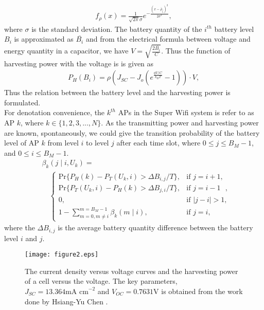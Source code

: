 \documentclass[conference]{IEEEtran}
\begin{document}
\begin{equation}
\begin{aligned}
f_{\rho}(x) = \frac {1} {\sqrt {2\pi}\sigma} e ^{-\frac {(x-\bar{\rho}_\zeta)^2} {2 {\sigma}^2}},
\end{aligned}
\end{equation}
where \(\sigma\) is the standard deviation.
The battery quantity of the \(i^{th}\) battery level \(B_i\) is approximated as \(\overline {B_i}\) and from the electrical formula between voltage and energy quantity in a capacitor, we have \(V = \sqrt{ \frac{2 \overline{B_i}} {C}}\). Thus the function of harvesting power with the voltage is is given as
\begin{equation}
\begin{aligned}
P_H(B_i) = \rho\left(J_{SC} - J_o\left(e^{\frac{qV / C} {k_B T}} - 1\right)\right) \cdot V,
\end{aligned}
\end{equation}
Thus the relation between the battery level and the harvesting power is formulated. \\
\indent For denotation convenience, the \(k^{th}\) APs in the Super Wifi system is refer to as AP \(k\), where \(k \in \{ 1,2,3,...,N \}\). As the transmitting power and harvesting power are known, spontaneously, we could give the transition probability of the battery level of AP \(k\) from level \(i\) to level \(j\) after each time slot, where \(0 \le j \le B_{M} - 1\), and \(0 \le i \le B_{M} - 1\).
\begin{align}
&\beta_{k}(j\mid i,U_k) =\\
&\quad\begin{cases}
\mbox{Pr}\{P_H(k) - P_T (U_k, i) >  {\Delta B_{i,j}}  /T  \}, &\mbox{if $j=i+1$},\\
\mbox{Pr}\{P_T (U_k, i) - P_H(k) > {\Delta B_{j,i}}  /T  \}, &\mbox{if $j=i-1$ },\\
0, &\mbox{if $|j-i|>1$},\\
1 - \sum_{m=0, m\ne i}^{m = B_{M} -1}\beta_{k}(m\mid i), &\mbox{if $j=i$},
\end{cases}\nonumber
\end{align}
where the \(\Delta B_{i,j}\) is the average battery quantity difference between the battery level \(i\) and \(j\).
\begin{figure}
\centering
\texttt{[image: figure2.eps]}\\
\caption{The current density versus voltage curves and the harvesting power of a cell versus the voltage. The key parameters, \(J_{SC} = 13.364\mbox{mA cm}^{-2}\) and \(V_{OC} = 0.7631\mbox{V}\) is obtained from the work done by Hsiang-Yu Chen \cite{3}.}
\end{figure}
\end{document}
